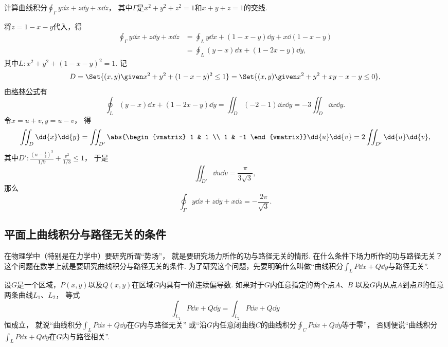 \begin{example}
计算曲线积分\(\oint_\Gamma y \dd{x} + z \dd{y} + x \dd{z}\)，
其中\(\Gamma\)是\(x^2+y^2+z^2=1\)和\(x+y+z=1\)的交线.
\begin{solution}
将\(z = 1-x-y\)代入，得\begin{align*}
	\oint_\Gamma y \dd{x} + z \dd{y} + x \dd{z}
	&= \oint_L y \dd{x} + (1-x-y) \dd{y} + x \dd(1-x-y) \\
	&= \oint_L (y-x) \dd{x} + (1-2x-y) \dd{y},
\end{align*}
其中\(L: x^2+y^2+(1-x-y)^2=1\).
记\begin{equation*}
	D = \Set{ (x,y) \given x^2+y^2+(1-x-y)^2\leq1 }
	= \Set{ (x,y) \given x^2+y^2+xy-x-y\leq0 },
\end{equation*}
由\hyperref[equation:线积分与面积分.格林公式]{格林公式}有\begin{equation*}
	\oint_L (y-x) \dd{x} + (1-2x-y) \dd{y}
	= \iint_D (-2-1) \dd{x}\dd{y}
	= -3 \iint_D \dd{x}\dd{y}.
\end{equation*}
令\(x = u+v,
y = u-v\)，
得\begin{equation*}
	\iint_D \dd{x}\dd{y}
	= \iint_{D'} \abs{\begin{vmatrix}
		1 & 1 \\
		1 & -1
	\end{vmatrix}} \dd{u}\dd{v}
	= 2 \iint_{D'} \dd{u}\dd{v},
\end{equation*}
其中\(D': \frac{(u-\frac13)^3}{1/9}+\frac{v^2}{1/3}\leq1\)，
于是\begin{equation*}
	\iint_{D'} \dd{u}\dd{v}
	= \frac\pi{3\sqrt3},
\end{equation*}
那么\begin{equation*}
	\oint_\Gamma y \dd{x} + z \dd{y} + x \dd{z}
	= -\frac{2\pi}{\sqrt3}.
\end{equation*}
\end{solution}
\end{example}

\subsection{平面上曲线积分与路径无关的条件}
在物理学中（特别是在力学中）要研究所谓“势场”，
就是要研究场力所作的功与路径无关的情形.
在什么条件下场力所作的功与路径无关？
这个问题在数学上就是要研究曲线积分与路径无关的条件.
为了研究这个问题，先要明确什么叫做“曲线积分\(\int_L P\dd{x}+Q\dd{y}\)与路径无关”.
\begin{definition}
设\(G\)是一个区域，\(P(x,y)\)以及\(Q(x,y)\)在区域\(G\)内具有一阶连续偏导数.
如果对于\(G\)内任意指定的两个点\(A\)、\(B\)
以及\(G\)内从点\(A\)到点\(B\)的任意两条曲线\(L_1\)、\(L_2\)，
等式\[
	\int_{L_1} P\dd{x}+Q\dd{y}
	=\int_{L_2} P\dd{x}+Q\dd{y}
\]恒成立，
就说“曲线积分\(\int_L P\dd{x}+Q\dd{y}\)在\(G\)内与路径无关”
或“沿\(G\)内任意闭曲线\(C\)的曲线积分\(\oint_C P\dd{x}+Q\dd{y}\)等于零”，
否则便说“曲线积分\(\int_L P\dd{x}+Q\dd{y}\)在\(G\)内与路径相关”.
\end{definition}

